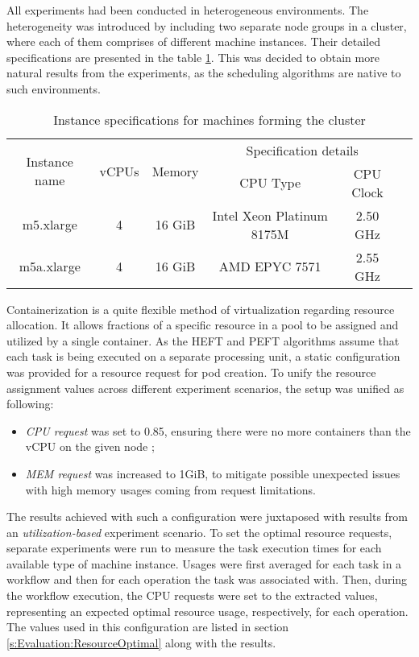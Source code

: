 All experiments had been conducted in heterogeneous environments.
The heterogeneity was introduced by including two separate node groups in a cluster, where each of them comprises of different machine instances.
Their detailed specifications are presented in the table \cref{tab:ex-setup:instances}.
This was decided to obtain more natural results from the experiments, as the scheduling algorithms are native to such environments.


\begin{table}[H]
    \centering
    \begin{tabular}{|c|c|c|c|c|c|}
    \cline{1-5}
        \multirow{2}{*}{Instance name} 
        &
        \multirow{2}{*}{vCPUs}
        &
        \multirow{2}{*}{Memory}
        &
        \multicolumn{2}{|c|}{Specification details} \\
    \cline{4-5}
        & & & CPU Type & CPU Clock \\
    \cline{1-5}
        m5.xlarge & 4 & 16 GiB & Intel Xeon Platinum 8175M & 2.50 GHz \\
    \cline{1-5}
        m5a.xlarge & 4 & 16 GiB & AMD EPYC 7571 & 2.55 GHz \\
    \cline{1-5}
    \end{tabular}
    \caption{Instance specifications for machines forming the cluster}
    \label{tab:ex-setup:instances}
\end{table}


Containerization is a quite flexible method of virtualization regarding resource allocation.
It allows fractions of a specific resource in a pool to be assigned and utilized by a single container.   
As the HEFT and PEFT algorithms assume that each task is being executed on a separate processing unit, a static configuration was provided for a resource request for pod creation.
To unify the resource assignment values across different experiment scenarios, the setup was unified as following:

\begin{itemize}[topsep=0pt]
  \item{
\emph{CPU request} was set to 0.85, ensuring there were no more containers than the vCPU on the given node
};
  \item{
\emph{MEM request} was increased to 1GiB, to mitigate possible unexpected issues with high memory usages coming from request limitations.
}
\end{itemize}
The results achieved with such a configuration were juxtaposed with results from an \emph{utilization-based} experiment scenario.
To set the optimal resource requests, separate experiments were run to  measure the task execution times for each available type of machine instance.
Usages were first averaged for each task in a workflow and then for each operation the task was associated with.
Then, during the workflow execution, the CPU requests were set to the extracted values, representing an expected optimal resource usage, respectively, for each operation.
The values used in this configuration are listed in section \ref{s:Evaluation:ResourceOptimal} along with the results.

